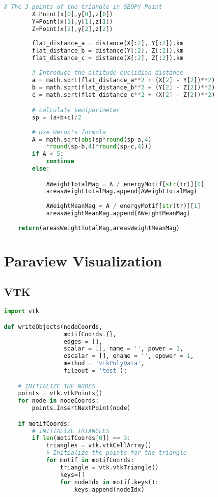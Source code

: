 \documentclass[12pt, twoside]{report}
\begin{document}
\begin{appendices}
\begin{lstlisting}[language=python, frame=single, tabsize=1]
        # The 3 points of the triangle in GEOPY Point
        X=Point(x[0],y[0],z[0])
        Y=Point(x[1],y[1],z[1])
        Z=Point(x[2],y[2],z[2])
        
        flat_distance_a = distance(X[:2], Y[:2]).km 
        flat_distance_b = distance(Y[:2], Z[:2]).km
        flat_distance_c = distance(X[:2], Z[:2]).km
        
        # Introduce the altitude euclidian distance
        a = math.sqrt(flat_distance_a**2 + (X[2] - Y[2])**2)
        b = math.sqrt(flat_distance_b**2 + (Y[2] - Z[2])**2)
        c = math.sqrt(flat_distance_c**2 + (X[2] - Z[2])**2)

        # calculate semiperimeter
        sp = (a+b+c)/2
        
        # Use Heron's formula 
        A = math.sqrt(abs(sp*round(sp-a,4)
        	*round(sp-b,4)*round(sp-c,4)))
        if A < 5:
            continue
        else:

            AWeightTotalMag = A / energyMotif[str(tr)][0]
            areasWeightTotalMag.append(AWeightTotalMag)
            
            AWeightMeanMag = A / energyMotif[str(tr)][1]
            areasWeightMeanMag.append(AWeightMeanMag)
            
    return(areasWeightTotalMag,areasWeightMeanMag)
\end{lstlisting}

\chapter{Paraview Visualization}
\section{VTK}
\begin{lstlisting}[language=python, frame=single, tabsize=1] 
import vtk

def writeObjects(nodeCoords,
                 motifCoords={},
                 edges = [],
                 scalar = [], name = '', power = 1,
                 escalar = [], ename = '', epower = 1,
                 method = 'vtkPolyData',
                 fileout = 'test'):

    # INITIALIZE THE NODES 
    points = vtk.vtkPoints()
    for node in nodeCoords:
        points.InsertNextPoint(node)   

    if motifCoords:
        # INITIALIZE TRIANGLES
        if len(motifCoords[0]) == 3:
            triangles = vtk.vtkCellArray()
            # Initialize the points for the triangle
            for motif in motifCoords:
                triangle = vtk.vtkTriangle()
                keys=[]
                for nodeIdx in motif.keys():
                    keys.append(nodeIdx)


\end{lstlisting}
\end{appendices}
\end{document}
